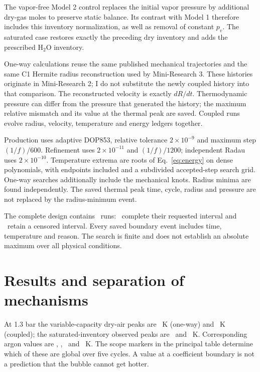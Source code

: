 \documentclass[10pt,a4paper]{article}
\begin{document}
The vapor-free Model 2 control replaces the initial vapor pressure by additional dry-gas moles to preserve static balance. Its contrast with Model 1 therefore includes this inventory normalization, as well as removal of constant $p_v$. The saturated case restores exactly the preceding dry inventory and adds the prescribed H$_2$O inventory.

One-way calculations reuse the same published mechanical trajectories and the same C1 Hermite radius reconstruction used by Mini-Research 3. These histories originate in Mini-Research 2; I do not substitute the newly coupled history into that comparison. The reconstructed velocity is exactly $dR/dt$. Thermodynamic pressure can differ from the pressure that generated the history; the maximum relative mismatch and its value at the thermal peak are saved. Coupled runs evolve radius, velocity, temperature and energy ledgers together.

Production uses adaptive DOP853, relative tolerance $2\times10^{-9}$ and maximum step $(1/f)/600$. Refinement uses $2\times10^{-11}$ and $(1/f)/1200$; independent Radau uses $2\times10^{-10}$. Temperature extrema are roots of Eq.~\eqref{eq:energy} on dense polynomials, with endpoints included and a subdivided accepted-step search grid. One-way searches additionally include the mechanical knots. Radius minima are found independently. The saved thermal peak time, cycle, radius and pressure are not replaced by the radius-minimum event.

\begin{table}[H]\centering\small
\caption{Principal comparison at $\eta=1$. OW: one-way; CO: coupled. M1 uses variable dry heat capacity and legacy $p_v$; M2 uses the fixed saturated inventory. A dagger denotes the maximum on an observed, censored interval, not a five-cycle global maximum. The relative change uses M2 versus the same-mode MR3 peak only when M2 completes five cycles.}

\end{table}
The complete design contains \RunCount\ runs: \CompletedCount\ complete their requested interval and \CensoredCount\ retain a censored interval. Every saved boundary event includes time, temperature and reason. The search is finite and does not establish an absolute maximum over all physical conditions.

\newpage
\section{Results and separation of mechanisms}
At 1.3 bar the variable-capacity dry-air peaks are \AirDryOW\ K (one-way) and \AirDryCO\ K (coupled); the saturated-inventory observed peaks are \AirWetOW\ and \AirWetCO\ K. Corresponding argon values are \ArgonDryOW, \ArgonDryCO, \ArgonWetOW\ and \ArgonWetCO\ K. The scope markers in the principal table determine which of these are global over five cycles. A value at a coefficient boundary is not a prediction that the bubble cannot get hotter.
\end{document}
